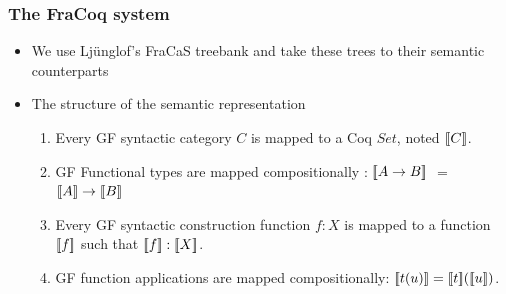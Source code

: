 \documentclass[11pt]{beamer}
\begin{document}
\begin{frame}[fragile]
	\frametitle{The FraCoq system}
	
	\begin{itemize}
	
		\item We use Lj\"unglof's FraCaS treebank and take these trees to their semantic counterparts
		
			\item The structure of the semantic representation 
			
		\begin{enumerate}
			\item Every GF syntactic category $C$ is mapped to a Coq $Set$, noted $\sem{C}$.
			\item GF Functional types are mapped compositionally : $\sem{A \to B}$ $=$ $\sem{A} \to \sem{B}$
			\item Every GF syntactic construction function $f : X$ is mapped to a function $\sem{f}$ such that $\sem{f} : \sem{X}$.
			\item GF function applications are mapped compositionally: $\sem{t(u)} = \sem{t} (\sem{u})$.
		\end{enumerate} 

\end{itemize}
\end{frame}
\end{document}
